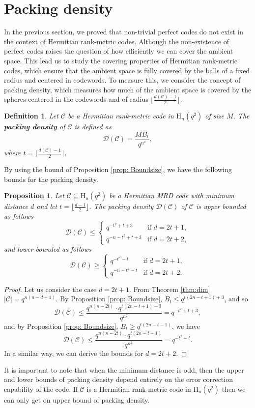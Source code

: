 \documentclass[12pt,a4paper]{article}
\newtheorem{definition}[theorem]{Definition}
\newtheorem{proposition}[theorem]{Proposition}
\begin{document}
\section{{Packing density}}\label{sec : 4}

In the previous section, we proved that non-trivial perfect codes do not exist in the context of Hermitian rank-metric codes. {Although the non-existence of perfect codes raises the question of how efficiently we can cover the ambient space. This lead us to study the covering properties of Hermitian rank-metric codes, which  ensure that the ambient space is fully covered by the balls of a fixed radius and centered in codewords. To measure this, we consider the concept of packing density}, which measures how much of the ambient space is covered by the spheres centered in the codewords and of radius $\lfloor \frac{ d(\mathscr{C})-1}{2}\rfloor$.
\begin{definition}
    Let $\mathscr{C}$ be a Hermitian rank-metric code in $\mathrm{H}_n(q^2)$ of size $M$. The \textbf{{packing density}} of $\mathscr{C}$ is defined as 
\[\mathscr{D(C)}=\frac{MB_{t}}{q^{n^2}},\] where $t=\lfloor \frac{d(\mathscr{C})-1}{2}\rfloor$.
\end{definition}
By using the bound of Proposition \ref{prop: Boundsize}, we have the following bounds for the {packing density}.
\begin{proposition}\label{prop:4.2}
Let $\mathscr{C}\subseteq\mathrm{H}_n(q^2)$ be a Hermitian MRD code with minimum distance $d$ and let $t=\lfloor \frac{d-1}{2}\rfloor$. 
The {packing density} $\mathscr{D(C)}$ of $\mathscr{C}$ is upper bounded as follows
\[\mathscr{D(C)}\leq\begin{cases}
q^{-t^2+t+3} &\text{if  }  d=2t+1,\\
q^{-n-t^2+t+3} &\text{if  }  d=2t+2,  
\end{cases} \]
and lower bounded as follows
\[\mathscr{D(C)}\geq\begin{cases}
   q^{-t^2-t} &\text{if  }  d=2t+1,\\
   q^{-n-t^2-t} &\text{if  }  d=2t+2.
\end{cases}\]
\end{proposition}
\begin{proof}
   { Let us consider the case $d=2t+1$. From Theorem \ref{thm:dim} $|\mathscr{C}|= q^{n(n-d+1)}$. By Proposition \ref{prop: Boundsize}, $B_t\leq q^{t(2n-t+1)+3}$, and so \[
\mathscr{D(C)} \leq \frac{q^{n (n - 2t)} \cdot q^{t(2n - t + 1) + 3}}{q^{n^2}} = q^{-t^2 + t + 3},
\]
and by Proposition \ref{prop: Boundsize}, $B_t \geq q^{t(2n-t-1)}$, we have \[
\mathscr{D(C)} \leq \frac{q^{n (n - 2t)} \cdot q^{t(2n - t -1)}}{q^{n^2}} = q^{-t^2 -t}.
\]
In a similar way, we can derive the bounds for $d=2t+2$.}
\end{proof}
It is important to note that when the minimum distance is odd, then the upper and lower bounds of {packing density} depend entirely on the error correction capability of the code. If $\mathscr{C}$ is a Hermitian rank-metric code in $\mathrm{H}_{n}(q^2)$ then we can only get on upper bound of {packing density}.
 
\end{document}
